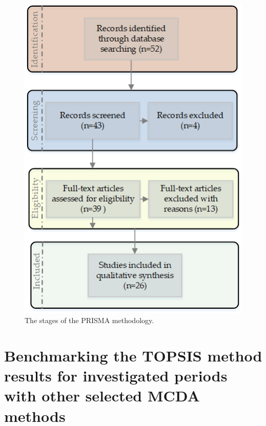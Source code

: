 \documentclass[final,5p,times,twocolumn,authoryear]{elsarticle}
\begin{document}
%
\begin{figure}[H]
    \centering
    \includegraphics[width=0.7\linewidth]{PRISMA_v102.png}
    \caption{The stages of the PRISMA methodology.}
    \label{fig:PRISMA}
\end{figure}
%

\section{Benchmarking the TOPSIS method results for investigated periods with other selected MCDA methods}
\label{sec:app1}
\end{document}
